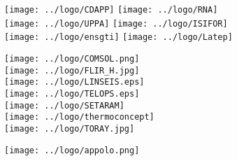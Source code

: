 \newpage
{}
\addtocounter{chapter}{1}




\begin{center}
\texttt{[image: ../logo/CDAPP]}
\hfil\hfil
\texttt{[image: ../logo/RNA]}
\\
\texttt{[image: ../logo/UPPA]}
\hfil\hfil
\texttt{[image: ../logo/ISIFOR]}
\\
\texttt{[image: ../logo/ensgti]}
\hfil\hfil
\texttt{[image: ../logo/Latep]}

\end{center}

{}

\begin{center}
\mbox{\hspace{4cm}\texttt{[image: ../logo/COMSOL.png]}}\\[4mm]
\mbox{\texttt{[image: ../logo/FLIR\_H.jpg]}\hspace{4cm}}\\[4mm]
\mbox{\hspace{4cm}\texttt{[image: ../logo/LINSEIS.eps]}}\\[4mm]
\mbox{\texttt{[image: ../logo/TELOPS.eps]}\hspace*{4cm}}\\[4mm]
%
\mbox{\hspace{4cm}\texttt{[image: ../logo/SETARAM]}}\\[4mm]
\mbox{\texttt{[image: ../logo/thermoconcept]}\hspace{4cm}}\\[4mm]
%
\mbox{\texttt{[image: ../logo/TORAY.jpg]}}\\
\end{center}
\begin{center}
\texttt{[image: ../logo/appolo.png]}
\end{center}





